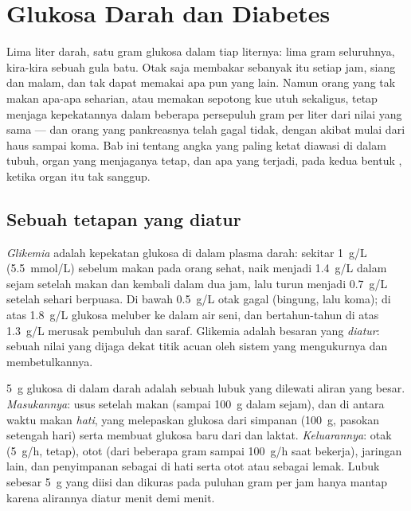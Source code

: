 \chapter{Glukosa Darah dan Diabetes}\label{ch:g12:glucose-and-diabetes}

Lima liter darah, satu gram glukosa dalam tiap liternya: lima gram
seluruhnya, kira-kira sebuah gula batu. Otak saja membakar sebanyak itu
setiap jam, siang dan malam, dan tak dapat memakai apa pun yang lain.
Namun orang yang tak makan apa-apa seharian, atau memakan sepotong kue
utuh sekaligus, tetap menjaga kepekatannya dalam beberapa persepuluh
gram per liter dari nilai yang sama --- dan orang yang pankreasnya
telah gagal tidak, dengan akibat mulai dari haus sampai koma. Bab ini
tentang angka yang paling ketat diawasi di dalam tubuh, organ yang
menjaganya tetap, dan apa yang terjadi, pada kedua bentuk ,
ketika organ itu tak sanggup.

\section{Sebuah tetapan yang diatur}

\begin{definition}[Glikemia]\label{def:g12:glucose-and-diabetes:glycaemia}
\emph{Glikemia} adalah kepekatan glukosa di dalam
plasma darah: sekitar \qty{1}{g/L} (\qty{5.5}{mmol/L}) sebelum makan
pada orang sehat, naik menjadi \qty{1.4}{g/L} dalam sejam setelah makan
dan kembali dalam dua jam, lalu turun menjadi \qty{0.7}{g/L} setelah
sehari berpuasa. Di bawah \qty{0.5}{g/L} otak gagal (bingung, lalu
koma); di atas \qty{1.8}{g/L} glukosa meluber ke dalam air seni, dan
bertahun-tahun di atas \qty{1.3}{g/L} merusak pembuluh dan saraf.
Glikemia adalah besaran yang \emph{diatur}: sebuah nilai yang dijaga
dekat titik acuan oleh sistem yang mengukurnya dan membetulkannya.
\end{definition}

\begin{proposition}\label{prop:g12:glucose-and-diabetes:pool}
\qty{5}{g} glukosa di dalam darah adalah sebuah lubuk yang dilewati
aliran yang besar. \emph{Masukannya}: usus setelah makan (sampai
\qty{100}{g} dalam sejam), dan di antara waktu makan \emph{hati}, yang
melepaskan glukosa dari simpanan \emph{} (\qty{100}{g},
pasokan setengah hari) serta membuat glukosa baru dari  dan
laktat. \emph{Keluarannya}: otak (\qty{5}{g/h}, tetap), otot (dari
beberapa gram sampai \qty{100}{g/h} saat bekerja), jaringan lain, dan
penyimpanan sebagai  di hati serta otot atau sebagai lemak.
Lubuk sebesar \qty{5}{g} yang diisi dan dikuras pada puluhan gram per
jam hanya mantap karena alirannya diatur menit demi menit.
\end{proposition}
\admitted

